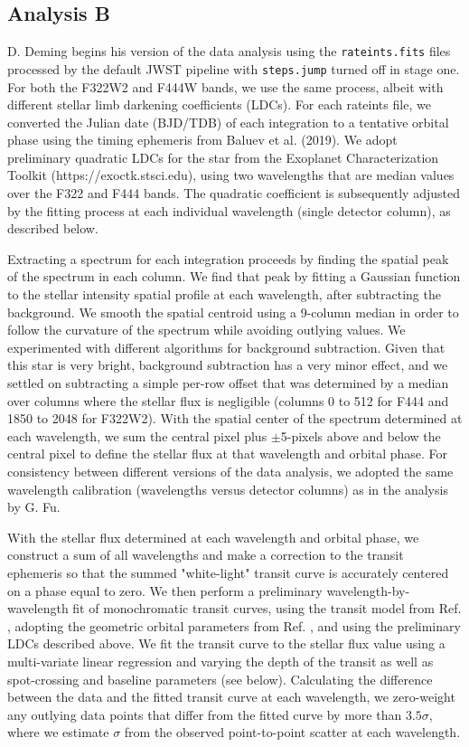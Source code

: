 \documentclass[sn-standardnature]{sn-jnl}%
\begin{document}
\subsection*{Analysis B}


D. Deming begins his version of the data analysis using the \texttt{rateints.fits} files processed by the default JWST pipeline with \texttt{steps.jump} turned off in stage one. For both the F322W2 and F444W bands, we use the same process, albeit with different stellar limb darkening coefficients (LDCs).  For each rateints file, we converted the Julian date (BJD/TDB) of each integration to a tentative orbital phase using the timing ephemeris from Baluev et al. (2019).  We adopt preliminary quadratic LDCs for the star from the Exoplanet Characterization Toolkit (https://exoctk.stsci.edu), using two wavelengths that are median values over the F322 and F444 bands.  The quadratic coefficient is subsequently adjusted by the fitting process at each individual wavelength (single detector column), as described below.

Extracting a spectrum for each integration proceeds by finding the spatial peak of the spectrum in each column. We find that peak by fitting a Gaussian function to the stellar intensity spatial profile at each wavelength, after subtracting the background. We smooth the spatial centroid using a 9-column median in order to follow the curvature of the spectrum while avoiding outlying values.  We experimented with different algorithms for background subtraction. Given that this star is very bright, background subtraction has a very minor effect, and we settled on subtracting a simple per-row offset that was determined by a median over columns where the stellar flux is negligible (columns 0 to 512 for F444 and 1850 to 2048 for F322W2).  With the spatial center of the spectrum determined at each wavelength, we sum the central pixel plus $\pm$5-pixels above and below the central pixel to define the stellar flux at that wavelength and orbital phase.  For consistency between different versions of the data analysis, we adopted the same wavelength calibration (wavelengths versus detector columns) as in the analysis by G. Fu.

With the stellar flux determined at each wavelength and orbital phase, we construct a sum of all wavelengths and make a correction to the transit ephemeris so that the summed "white-light" transit curve is accurately centered on a phase equal to zero.  We then perform a preliminary wavelength-by-wavelength fit of monochromatic transit curves, using the transit model from Ref. , adopting the geometric orbital parameters from Ref. , and using the preliminary LDCs described above.  We fit the transit curve to the stellar flux value using a multi-variate linear regression and varying the depth of the transit as well as spot-crossing and baseline parameters (see below). Calculating the difference between the data and the fitted transit curve at each wavelength, we zero-weight any outlying data points that differ from the fitted curve by more than $3.5\sigma$, where we estimate $\sigma$ from the observed point-to-point scatter at each wavelength.
\end{document}
